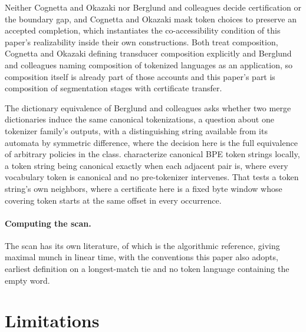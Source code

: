 \documentclass[11pt,a4paper]{article}
\theoremstyle{definition}
\theoremstyle{plain}
\begin{document}
Neither Cognetta and Okazaki nor Berglund and colleagues decide certification or the boundary gap, and Cognetta and
Okazaki mask token choices to preserve an accepted completion, which instantiates the co-accessibility condition of this
paper's realizability inside their own constructions. Both treat composition, Cognetta and Okazaki defining transducer
composition explicitly and Berglund and colleagues naming composition of tokenized languages as an application, so
composition itself is already part of those accounts and this paper's part is composition of segmentation stages with
certificate transfer.

The dictionary equivalence of Berglund and colleagues asks whether two merge dictionaries induce the same canonical
tokenizations, a question about one tokenizer family's outputs, with a distinguishing string available from its automata
by symmetric difference, where the decision here is the full equivalence of arbitrary policies in the class.
\citet{vieira2025canonical} characterize canonical BPE token strings locally, a token string being canonical exactly
when each adjacent pair is, where every vocabulary token is canonical and no pre-tokenizer intervenes. That tests a
token string's own neighbors, where a certificate here is a fixed byte window whose covering token starts at the same
offset in every occurrence.

\paragraph{Computing the scan.} The scan has its own literature, of which \citet{reps1998maximal} is the algorithmic
reference, giving maximal munch in linear time, with the conventions this paper also adopts, earliest definition on a
longest-match tie and no token language containing the empty word.

\section{Limitations}
\end{document}
